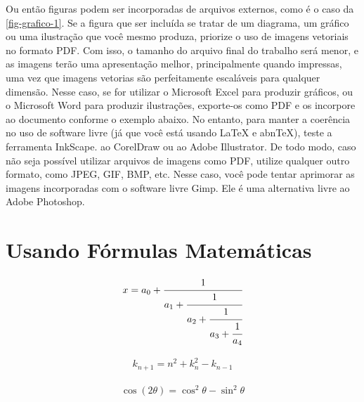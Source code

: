 Ou então figuras podem ser incorporadas de arquivos externos, como é o caso da \autoref{fig-grafico-1}. Se a figura que ser incluída se tratar de um diagrama, um gráfico ou uma ilustração que você mesmo produza, priorize o uso de imagens vetoriais no formato PDF. Com isso, o tamanho do arquivo final do trabalho será menor, e as imagens terão uma apresentação melhor, principalmente quando impressas, uma vez que imagens vetorias são perfeitamente escaláveis para qualquer dimensão. Nesse caso, se for utilizar o Microsoft Excel para produzir gráficos, ou o Microsoft Word para produzir ilustrações, exporte-os como PDF e os incorpore ao documento conforme o exemplo abaixo. No entanto, para manter a coerência no uso de software livre (já que você está usando LaTeX e abnTeX),  teste a ferramenta InkScape. ao CorelDraw ou ao Adobe Illustrator.  De todo modo, caso não seja possível  utilizar arquivos de imagens como PDF, utilize qualquer outro formato, como JPEG, GIF, BMP, etc.  Nesse caso, você pode tentar aprimorar as imagens incorporadas com o software livre Gimp. Ele é uma alternativa livre ao Adobe Photoshop.

\section{Usando Fórmulas Matemáticas}

\lipsum[2]

	\begin{equation}
		\begin{aligned}
			x = a_0 + \cfrac{1}{a_1
				+ \cfrac{1}{a_2
					+ \cfrac{1}{a_3 + \cfrac{1}{a_4} } } }
		\end{aligned}
	\end{equation}

\lipsum[3]

	\begin{equation}
		\begin{aligned}
			k_{n+1} = n^2 + k_n^2 - k_{n-1}
		\end{aligned}
	\end{equation}

\lipsum[4]

	\begin{equation}
		\begin{aligned}
			\cos (2\theta) = \cos^2 \theta - \sin^2 \theta
		\end{aligned}
	\end{equation}
	
